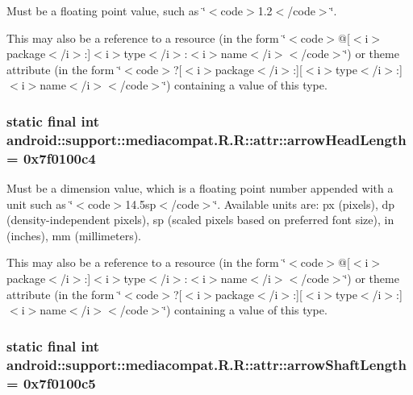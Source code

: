 Must be a floating point value, such as \char`\"{}$<$code$>$1.2$<$/code$>$\char`\"{}. 

This may also be a reference to a resource (in the form \char`\"{}$<$code$>$@\mbox{[}$<$i$>$package$<$/i$>$:\mbox{]}$<$i$>$type$<$/i$>$:$<$i$>$name$<$/i$>$$<$/code$>$\char`\"{}) or theme attribute (in the form \char`\"{}$<$code$>$?\mbox{[}$<$i$>$package$<$/i$>$:\mbox{]}\mbox{[}$<$i$>$type$<$/i$>$:\mbox{]}$<$i$>$name$<$/i$>$$<$/code$>$\char`\"{}) containing a value of this type. \hypertarget{classandroid_1_1support_1_1mediacompat_1_1_r_1_1attr_402b95d96f54cc4a2a017b7b1ad864ba}{
\subsubsection[{arrowHeadLength}]{\setlength{\rightskip}{0pt plus 5cm}static final int android::support::mediacompat.R.R::attr::arrowHeadLength = 0x7f0100c4}}
\label{classandroid_1_1support_1_1mediacompat_1_1_r_1_1attr_402b95d96f54cc4a2a017b7b1ad864ba}


Must be a dimension value, which is a floating point number appended with a unit such as \char`\"{}$<$code$>$14.5sp$<$/code$>$\char`\"{}. Available units are: px (pixels), dp (density-independent pixels), sp (scaled pixels based on preferred font size), in (inches), mm (millimeters). 

This may also be a reference to a resource (in the form \char`\"{}$<$code$>$@\mbox{[}$<$i$>$package$<$/i$>$:\mbox{]}$<$i$>$type$<$/i$>$:$<$i$>$name$<$/i$>$$<$/code$>$\char`\"{}) or theme attribute (in the form \char`\"{}$<$code$>$?\mbox{[}$<$i$>$package$<$/i$>$:\mbox{]}\mbox{[}$<$i$>$type$<$/i$>$:\mbox{]}$<$i$>$name$<$/i$>$$<$/code$>$\char`\"{}) containing a value of this type. \hypertarget{classandroid_1_1support_1_1mediacompat_1_1_r_1_1attr_56048bc375132733c86f8957f5afe302}{
\subsubsection[{arrowShaftLength}]{\setlength{\rightskip}{0pt plus 5cm}static final int android::support::mediacompat.R.R::attr::arrowShaftLength = 0x7f0100c5}}
\label{classandroid_1_1support_1_1mediacompat_1_1_r_1_1attr_56048bc375132733c86f8957f5afe302}



